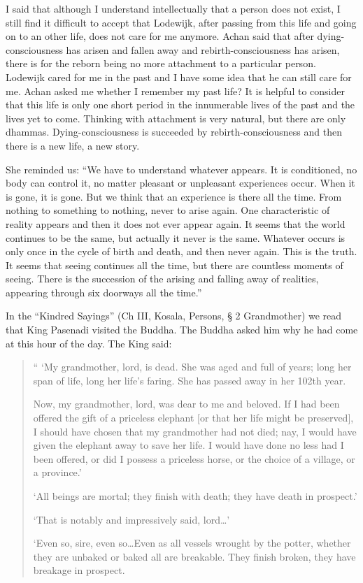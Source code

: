 I said that although I understand intellectually that a person does not exist, I still find 
it difficult to accept that Lodewijk, after passing from this life and going on to an 
other life, does not care for me anymore.  Achan said that after dying-consciousness 
has arisen and fallen away and rebirth-consciousness has arisen, there is for the reborn being no more attachment to a particular person. Lodewijk cared for me in the 
past and I have some idea that he can still care for me.  Achan asked me whether I remember my past life? It is helpful to consider that this life is only one short period in 
the innumerable lives of the past and the lives yet to come. Thinking with attachment 
is very natural, but there are only dhammas. Dying-consciousness is succeeded by rebirth-consciousness and then there is a new life, a new story. 

She reminded us: ``We have to understand whatever appears. It is conditioned, no 
body can control it, no matter pleasant or unpleasant experiences occur. When it is 
gone, it is gone. But we think that an experience is there all the time. From nothing to 
something to nothing, never to arise again. One characteristic of reality appears and 
then it does not ever appear again. It seems that the world continues to be the same, 
but actually it never is the same. Whatever occurs is only once in the cycle of birth 
and death, and then never again. This is the truth. It seems that seeing continues all 
the time, but there are countless moments of seeing. There is the succession of the 
arising and falling away of realities, appearing through six doorways all the time.'' 

In the ``Kindred Sayings'' (Ch III, Kosala, Persons, § 2 Grandmother) we read that 
King Pasenadi visited the Buddha. The Buddha asked him why he had come at this 
hour of the day. The King said: 

\begin{quote}
`` `My grandmother, lord, is dead. She was aged and full of years; long 
her span of life, long her life’s faring. She has passed away in her 
102th year. 

Now, my grandmother, lord, was dear to me and beloved. If I had 
been offered the gift of a priceless elephant [or that her life might be 
preserved], I should have chosen that my grandmother had not died; 
nay, I would have given the elephant away to save her life. I would 
have done no less had I been offered, or did I possess a priceless 
horse, or the choice of a village, or a province.’ 

`All beings are mortal; they finish with death; they have death in prospect.’ 

`That is notably and impressively said, lord\ldots’ 

`Even so, sire, even so\ldots Even as all vessels wrought by the potter, 
whether they are unbaked or baked all are breakable. They finish 
broken, they have breakage in prospect. 
\end{quote}

